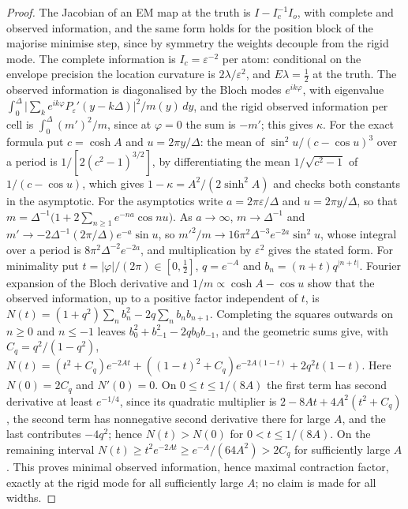 \begin{proof}
The Jacobian of an EM map at the truth is $I-I_c^{-1}I_o$, with complete and observed information, and the same form holds for the position block of the majorise minimise step, since by symmetry the weights decouple from the rigid mode. The complete information is $I_c=\varepsilon^{-2}$ per atom: conditional on the envelope precision the location curvature is $2\lambda/\varepsilon^2$, and $E\lambda=\frac12$ at the truth. The observed information is diagonalised by the Bloch modes $e^{ik\varphi}$, with eigenvalue $\int_0^\Delta\big|\sum_ke^{ik\varphi}P_\varepsilon'(y-k\Delta)\big|^2/m(y)\,dy$, and the rigid observed information per cell is $\int_0^\Delta(m')^2/m$, since at $\varphi=0$ the sum is $-m'$; this gives $\kappa$. For the exact formula put $c=\cosh A$ and $u=2\pi y/\Delta$: the mean of $\sin^2u/(c-\cos u)^3$ over a period is $1/[2(c^2-1)^{3/2}]$, by differentiating the mean $1/\sqrt{c^2-1}$ of $1/(c-\cos u)$, which gives $1-\kappa=A^2/(2\sinh^2A)$ and checks both constants in the asymptotic. For the asymptotics write $a=2\pi\varepsilon/\Delta$ and $u=2\pi y/\Delta$, so that $m=\Delta^{-1}\big(1+2\sum_{n\ge1}e^{-na}\cos nu\big)$. As $a\to\infty$, $m\to\Delta^{-1}$ and $m'\to-2\Delta^{-1}(2\pi/\Delta)e^{-a}\sin u$, so $m'^2/m\to16\pi^2\Delta^{-3}e^{-2a}\sin^2u$, whose integral over a period is $8\pi^2\Delta^{-2}e^{-2a}$, and multiplication by $\varepsilon^2$ gives the stated form. For minimality put $t=|\varphi|/(2\pi)\in[0,\frac12]$, $q=e^{-A}$ and $b_n=(n+t)q^{|n+t|}$. Fourier expansion of the Bloch derivative and $1/m\propto\cosh A-\cos u$ show that the observed information, up to a positive factor independent of $t$, is $N(t)=(1+q^2)\sum_nb_n^2-2q\sum_nb_nb_{n+1}$. Completing the squares outwards on $n\ge0$ and $n\le-1$ leaves $b_0^2+b_{-1}^2-2qb_0b_{-1}$, and the geometric sums give, with $C_q=q^2/(1-q^2)$, $N(t)=(t^2+C_q)e^{-2At}+((1-t)^2+C_q)e^{-2A(1-t)}+2q^2t(1-t)$. Here $N(0)=2C_q$ and $N'(0)=0$. On $0\le t\le1/(8A)$ the first term has second derivative at least $e^{-1/4}$, since its quadratic multiplier is $2-8At+4A^2(t^2+C_q)$, the second term has nonnegative second derivative there for large $A$, and the last contributes $-4q^2$; hence $N(t)>N(0)$ for $0<t\le1/(8A)$. On the remaining interval $N(t)\ge t^2e^{-2At}\ge e^{-A}/(64A^2)>2C_q$ for sufficiently large $A$. This proves minimal observed information, hence maximal contraction factor, exactly at the rigid mode for all sufficiently large $A$; no claim is made for all widths.
\end{proof}

